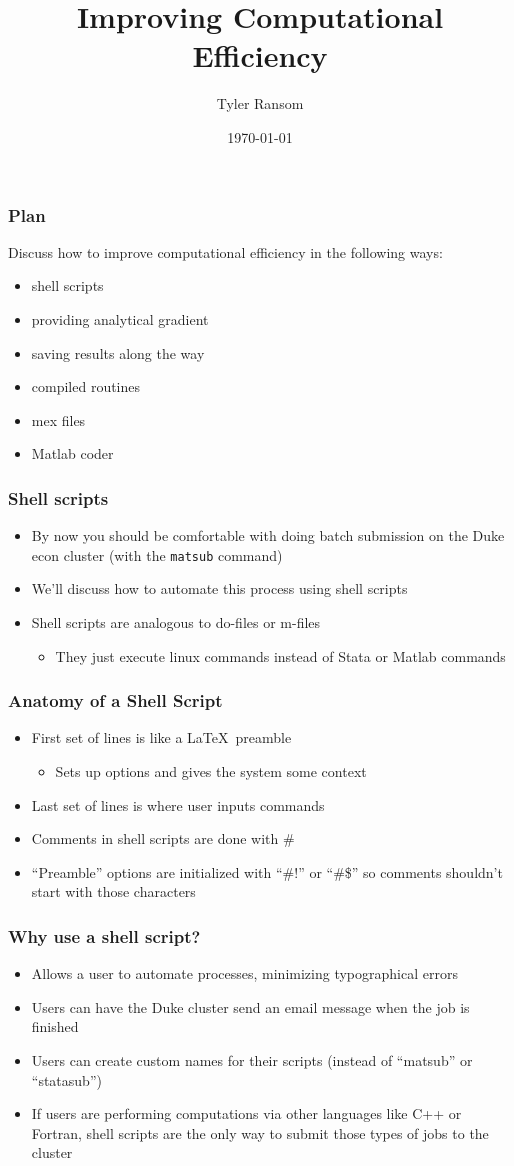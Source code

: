 \documentclass[english,xcolor=dvipsnames]{beamer}
\title[]{Improving Computational Efficiency}
\author{Tyler Ransom}
\institute{Duke University}
\date{\today}
\newcommand{\bi}{\begin{itemize}}
\newcommand{\ei}{\end{itemize}}
\begin{document}
\begin{frame}
   \titlepage
\end{frame}

\begin{frame}
\frametitle{Plan}
Discuss how to improve computational efficiency in the following ways:
      \bi 
      \item shell scripts
      \item providing analytical gradient
      \item saving results along the way
      \item compiled routines
      \item mex files
      \item Matlab coder
      \ei
\end{frame}

\begin{frame}
\frametitle{Shell scripts}

   \bi 
   \item By now you should be comfortable with doing batch submission on the Duke econ cluster (with the \texttt{matsub} command)
   \item We'll discuss how to automate this process using shell scripts
   \item Shell scripts are analogous to do-files or m-files
      \bi 
      \item They just execute linux commands instead of Stata or Matlab commands
      \ei
   \ei
\end{frame}

\begin{frame}
\frametitle{Anatomy of a Shell Script}

   \bi 
   \item First set of lines is like a \LaTeX\,  preamble
      \bi 
      \item Sets up options and gives the system some context
      \ei
   \item Last set of lines is where user inputs commands
   \item Comments in shell scripts are done with \#
   \item ``Preamble'' options are initialized with ``\#!'' or ``\#\$'' so comments shouldn't start with those characters
   \ei
\end{frame}

\begin{frame}
\frametitle{Why use a shell script?}

   \bi 
   \item Allows a user to automate processes, minimizing typographical errors
   \item Users can have the Duke cluster send an email message when the job is finished
   \item Users can create custom names for their scripts (instead of ``matsub'' or ``statasub'')
   \item If users are performing computations via other languages like C++ or Fortran, shell scripts are the only way to submit those types of jobs to the cluster
   \ei
\end{frame}
\end{document}
